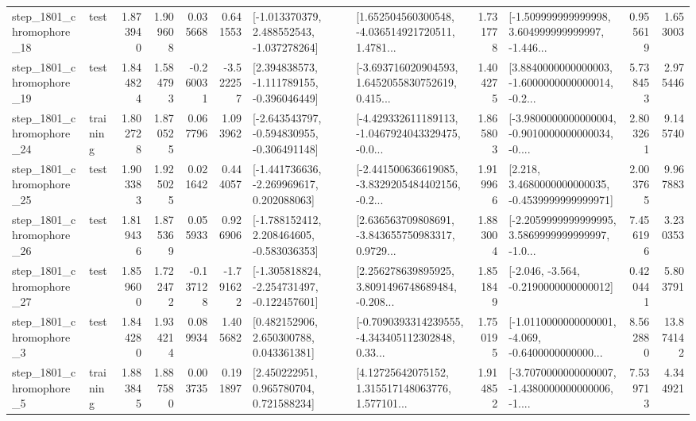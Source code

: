 \begin{tabular}{llrrrrllrlrr}
 step\_1801\_chromophore\_18 &      test &      1.873940 &    1.909608 &      0.035668 &  0.641553 &   [-1.013370379, 2.488552543, -1.037278264] &  [1.652504560300548, -4.036514921720511, 1.4781... &       1.731778 &  [-1.509999999999998, 3.604999999999997, -1.446... &            0.955619 &          1.653003 \\
 step\_1801\_chromophore\_19 &      test &      1.844824 &    1.584793 &     -0.260031 & -3.522257 &   [2.394838573, -1.111789155, -0.396046449] &  [-3.693716020904593, 1.6452055830752619, 0.415... &       1.404275 &  [3.8840000000000003, -1.6000000000000014, -0.2... &            5.738453 &          2.975446 \\
 step\_1801\_chromophore\_24 &  training &      1.802728 &    1.870525 &      0.067796 &  1.093962 &  [-2.643543797, -0.594830955, -0.306491148] &  [-4.429332611189113, -1.0467924043329475, -0.0... &       1.865803 &  [-3.9800000000000004, -0.9010000000000034, -0.... &            2.803261 &          9.145740 \\
 step\_1801\_chromophore\_25 &      test &      1.903383 &    1.925025 &      0.021642 &  0.444057 &   [-1.441736636, -2.269969617, 0.202088063] &  [-2.441500636619085, -3.8329205484402156, -0.2... &       1.919966 &   [2.218, 3.4680000000000035, -0.4539999999999971] &            2.003765 &          9.967883 \\
 step\_1801\_chromophore\_26 &      test &      1.819436 &    1.875369 &      0.055933 &  0.926906 &   [-1.788152412, 2.208464605, -0.583036353] &  [2.636563709808691, -3.843655750983317, 0.9729... &       1.883004 &  [-2.2059999999999995, 3.5869999999999997, -1.0... &            7.456196 &          3.230353 \\
 step\_1801\_chromophore\_27 &      test &      1.859600 &    1.722472 &     -0.137128 & -1.791622 &  [-1.305818824, -2.254731497, -0.122457601] &  [2.256278639895925, 3.8091496748689484, -0.208... &       1.851849 &              [-2.046, -3.564, -0.2190000000000012] &            0.420441 &          5.803791 \\
  step\_1801\_chromophore\_3 &      test &      1.844280 &    1.934214 &      0.089934 &  1.405682 &     [0.482152906, 2.650300788, 0.043361381] &  [-0.7090393314239555, -4.343405112302848, 0.33... &       1.750195 &  [-1.0110000000000001, -4.069, -0.6400000000000... &            8.562880 &         13.874142 \\
  step\_1801\_chromophore\_5 &  training &      1.883845 &    1.887580 &      0.003735 &  0.191897 &     [2.450222951, 0.965780704, 0.721588234] &  [4.12725642075152, 1.315517148063776, 1.577101... &       1.914852 &  [-3.7070000000000007, -1.4380000000000006, -1.... &            7.539713 &          4.344921 \\

\end{tabular}
